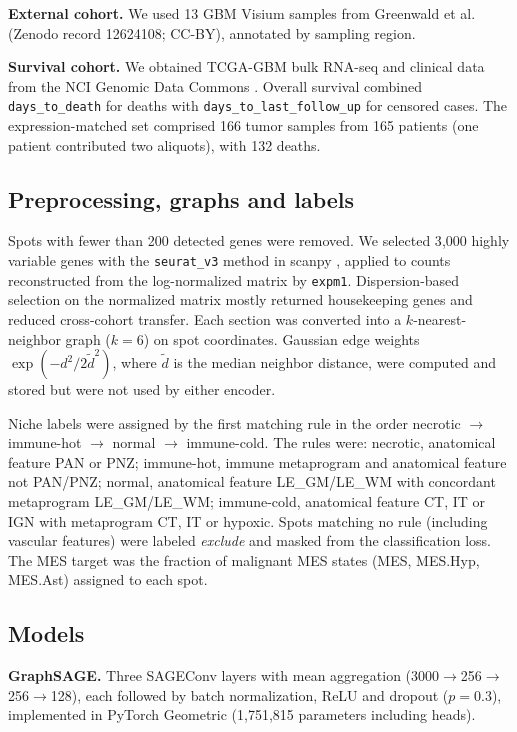 \documentclass[11pt,letterpaper]{article}
\begin{document}
\textbf{External cohort.} We used 13 GBM Visium samples from Greenwald et al.\ \cite{greenwald2024} (Zenodo record 12624108; CC-BY), annotated by sampling region.

\textbf{Survival cohort.} We obtained TCGA-GBM bulk RNA-seq and clinical data from the NCI Genomic Data Commons \cite{tcga2008}. Overall survival combined \texttt{days\_to\_death} for deaths with \texttt{days\_to\_last\_follow\_up} for censored cases. The expression-matched set comprised 166 tumor samples from 165 patients (one patient contributed two aliquots), with 132 deaths.

\subsection{Preprocessing, graphs and labels}

Spots with fewer than 200 detected genes were removed. We selected 3{,}000 highly variable genes with the \texttt{seurat\_v3} method \cite{stuart2019} in scanpy \cite{wolf2018}, applied to counts reconstructed from the log-normalized matrix by \texttt{expm1}. Dispersion-based selection on the normalized matrix mostly returned housekeeping genes and reduced cross-cohort transfer. Each section was converted into a $k$-nearest-neighbor graph ($k = 6$) on spot coordinates. Gaussian edge weights $\exp(-d^2 / 2\tilde{d}^2)$, where $\tilde{d}$ is the median neighbor distance, were computed and stored but were not used by either encoder.

Niche labels were assigned by the first matching rule in the order necrotic $\rightarrow$ immune-hot $\rightarrow$ normal $\rightarrow$ immune-cold. The rules were: necrotic, anatomical feature PAN or PNZ; immune-hot, immune metaprogram and anatomical feature not PAN/PNZ; normal, anatomical feature LE\_GM/LE\_WM with concordant metaprogram LE\_GM/LE\_WM; immune-cold, anatomical feature CT, IT or IGN with metaprogram CT, IT or hypoxic. Spots matching no rule (including vascular features) were labeled \emph{exclude} and masked from the classification loss. The MES target was the fraction of malignant MES states (MES, MES.Hyp, MES.Ast) assigned to each spot.

\subsection{Models}

\textbf{GraphSAGE.} Three SAGEConv layers \cite{hamilton2017} with mean aggregation (3000$\rightarrow$256$\rightarrow$256$\rightarrow$128), each followed by batch normalization, ReLU and dropout ($p = 0.3$), implemented in PyTorch Geometric \cite{fey2019} (1{,}751{,}815 parameters including heads).
\end{document}
